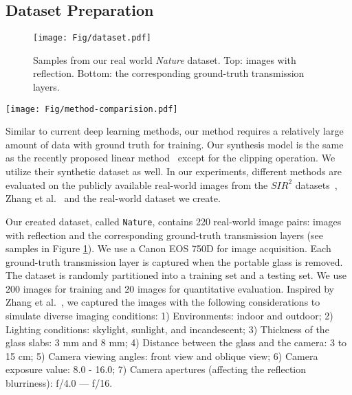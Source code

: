 \documentclass[10pt,twocolumn,letterpaper]{article}
\begin{document}
\subsection{Dataset Preparation}
\begin{figure}[h]
    \vspace{-1em}
    \begin{center}
        \texttt{[image: Fig/dataset.pdf]}
    \end{center}
    \vspace{-1em}
    \caption{Samples from our real world \textit{Nature} dataset. Top: images with reflection. Bottom: the corresponding ground-truth transmission layers.
    }
    \vspace{-0.5em}
    \label{fig:dataset}
\end{figure}


\begin{figure*}[htbp]
    \begin{center}
    \texttt{[image: Fig/method-comparision.pdf]}
    \end{center}
    \vspace{-1em}
    \caption{Visual comparison among state-of-the-art approaches and our method on images from three real-world image datasets, namely, \textit{Nature} (Rows 1-2), $SIR^2$ (Rows 3-4) and Zhang et al. (Rows 5-6). More results can be found in the \textit{suppl. material}.
    }
    \vspace{-0.5em}
    \label{fig:method-comparision}
\end{figure*}


Similar to current deep learning methods, our method requires a relatively large amount of data with ground truth for training. Our synthesis model is the same as the recently proposed linear method~\cite{zhang2018single} except for the clipping operation. We utilize their synthetic dataset as well. In our experiments, different methods are evaluated on the publicly available real-world images from the $SIR^2$ datasets~\cite{wan2017benchmarking}, Zhang et al.~\cite{zhang2018single} and the real-world dataset we create. 

Our created dataset, called \texttt{Nature}, contains 220 real-world image pairs: images with reflection and the corresponding ground-truth transmission layers (see samples in Figure \ref{fig:dataset}). We use a Canon EOS 750D for image acquisition. Each ground-truth transmission layer is captured when the portable glass is removed. The dataset is randomly partitioned into a training set and a testing set. We use 200 images for training and 20 images for quantitative evaluation. Inspired by Zhang et al.~\cite{zhang2018single}, we captured the images with the following considerations to simulate diverse imaging conditions: 1) Environments: indoor and outdoor; 2) Lighting conditions: skylight, sunlight, and incandescent; 3) Thickness of the glass slabs: 3 mm and 8 mm; 4) Distance between the glass and the camera: 3 to 15 cm; 5) Camera viewing angles: front view and oblique view; 6) Camera exposure value: 8.0 - 16.0; 7) Camera apertures (affecting the reflection blurriness): f/4.0 — f/16.
\end{document}
